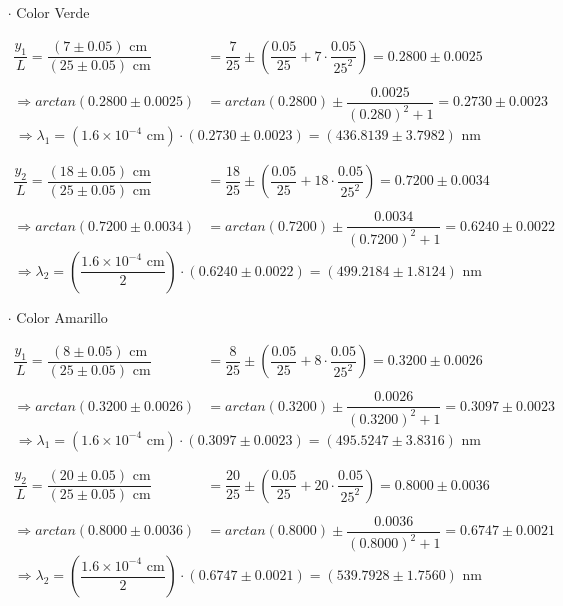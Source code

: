 \documentclass[12pt,a4paper]{article}
\begin{document}
\begin{itemize}
 		\item [$\cdot$] Color Verde
 		
 		\begin{align*}
 			\dfrac{y_1}{L}=\dfrac{(7\pm 0.05)\mbox{ cm}}{(25\pm 0.05)\mbox{ cm}}&=
 			\dfrac{7}{25}\pm\left(\dfrac{0.05}{25}+7\cdot\dfrac{0.05}{25^2}\right)=
 			0.2800\pm0.0025 \\\\
 			\Longrightarrow arctan(0.2800\pm0.0025)&=
 			arctan(0.2800)\pm\dfrac{0.0025}{(0.280)^2+1}=
 			0.2730\pm0.0023 
 		\end{align*}
 		$$\Longrightarrow \lambda_1=
 		(1.6\times 10^{-4}\mbox{ cm})\cdot
 		(0.2730\pm0.0023)=(436.8139\pm3.7982 )\mbox{ nm}$$
 		
 		\begin{align*}
 			\dfrac{y_2}{L}=\dfrac{(18\pm 0.05)\mbox{ cm}}{(25\pm 0.05)\mbox{ cm}}&=
 			\dfrac{18}{25}\pm\left(\dfrac{0.05}{25}+18\cdot\dfrac{0.05}{25^2}\right)=
 			0.7200\pm0.0034 \\\\
 			\Longrightarrow arctan(0.7200\pm0.0034)&=
 			arctan(0.7200)\pm\dfrac{0.0034}{(0.7200)^2+1}=
 			0.6240\pm0.0022
 		\end{align*}
 		$$\Longrightarrow \lambda_2=
 		\left(\dfrac{1.6\times 10^{-4}\mbox{ cm}}{2}\right)\cdot
 		(0.6240\pm0.0022 )=(499.2184\pm 1.8124)\mbox{ nm}$$
 		
 		\item [$\cdot$] Color Amarillo
 		
 		\begin{align*}
 			\dfrac{y_1}{L}=\dfrac{(8\pm 0.05)\mbox{ cm}}{(25\pm 0.05)\mbox{ cm}}&=
 			\dfrac{8}{25}\pm\left(\dfrac{0.05}{25}+8\cdot\dfrac{0.05}{25^2}\right)=
 			0.3200\pm0.0026 \\\\
 			\Longrightarrow arctan(0.3200\pm0.0026)&=
 			arctan(0.3200)\pm\dfrac{0.0026}{(0.3200)^2+1}=
 			0.3097\pm 0.0023
 		\end{align*}
 		$$\Longrightarrow \lambda_1=
 		(1.6\times 10^{-4}\mbox{ cm})\cdot
 		(0.3097\pm 0.0023 )=(495.5247\pm3.8316 )\mbox{ nm}$$
 		
 		\begin{align*}
 			\dfrac{y_2}{L}=\dfrac{(20\pm 0.05)\mbox{ cm}}{(25\pm 0.05)\mbox{ cm}}&=
 			\dfrac{20}{25}\pm\left(\dfrac{0.05}{25}+20\cdot\dfrac{0.05}{25^2}\right)=
 			0.8000\pm0.0036 \\\\
 			\Longrightarrow arctan(0.8000\pm0.0036)&=
 			arctan(0.8000)\pm\dfrac{0.0036}{(0.8000)^2+1}=
 			0.6747\pm0.0021 
 		\end{align*}
 		$$\Longrightarrow \lambda_2=
 		\left(\dfrac{1.6\times 10^{-4}\mbox{ cm}}{2}\right)\cdot
 		(0.6747\pm0.0021)=(539.7928\pm1.7560 )\mbox{ nm}$$
 		

\end{itemize}
\end{document}
